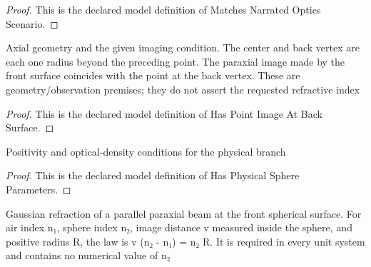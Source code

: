 \begin{proof}
  This is the declared model definition of Matches Narrated Optics Scenario.
\end{proof}
\begin{definition}
  \label{def:physics:phyx-mini-0477:phyxminiproblems-problemphyxmini0477-haspointimageatbacksurface}
  Axial geometry and the given imaging condition. The center and back vertex are each one radius beyond the preceding point. The paraxial image made by the front surface coincides with the point at the back vertex. These are geometry/observation premises; they do not assert the requested refractive index
\end{definition}
\begin{proof}
  This is the declared model definition of Has Point Image At Back Surface.
\end{proof}
\begin{definition}
  \label{def:physics:phyx-mini-0477:phyxminiproblems-problemphyxmini0477-hasphysicalsphereparameters}
  Positivity and optical-density conditions for the physical branch
\end{definition}
\begin{proof}
  This is the declared model definition of Has Physical Sphere Parameters.
\end{proof}
\begin{definition}
  \label{def:physics:phyx-mini-0477:phyxminiproblems-problemphyxmini0477-satisfiesparallelraysphericalrefractionlaw}
  Gaussian refraction of a parallel paraxial beam at the front spherical surface. For air index n₁, sphere index n₂, image distance v measured inside the sphere, and positive radius R, the law is v (n₂ - n₁) = n₂ R. It is required in every unit system and contains no numerical value of n₂
\end{definition}

